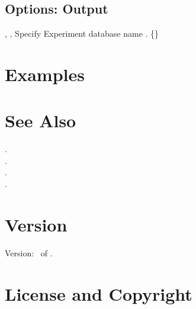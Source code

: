 \documentclass[english]{article}
\begin{document}
\subsection{Options: Output}

\begin{Description}

\item[\OptArg{-o}{db-path}, \OptArg{--db}{db-path}, \OptArg{--output}{db-path}]
Specify Experiment database name .
\{\}

\end{Description}


\section{Examples}






\section{See Also}

.\\
.\\
.\\
.

\section{Version}

Version: \Version\ of \Date.

\section{License and Copyright}
\end{document}
